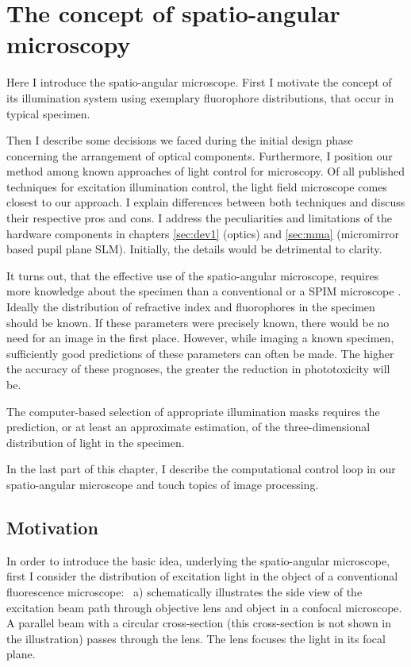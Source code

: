 \chapter{The concept of spatio-angular microscopy}
\label{sec:concept}
\begin{summary}
  Here I introduce the spatio-angular microscope. First I motivate
  the concept of its illumination system using exemplary fluorophore
  distributions, that occur in typical specimen.

  Then I describe some decisions we faced during the initial design
  phase concerning the arrangement of optical components. Furthermore,
  I position our method among known approaches of light control for
  microscopy. Of all published techniques for excitation illumination
  control, the light field microscope \citep{levoy2006} comes closest
  to our approach.  I explain differences between both techniques and
  discuss their respective pros and cons.  I address the peculiarities
  and limitations of the hardware components in chapters
  \ref{sec:dev1} (optics) and \ref{sec:mma} (micromirror based pupil
  plane SLM).  Initially, the details would be detrimental to clarity.

  It turns out, that the effective use of the spatio-angular
  microscope, requires more knowledge about the specimen than a
  conventional or a SPIM microscope \citep{Huisken2004}. Ideally
  the distribution of refractive index and fluorophores in the
  specimen should be known. If these parameters were precisely known,
  there would be no need for an image in the first place. However,
  while imaging a known specimen, sufficiently good predictions of
  these parameters can often be made. The higher the accuracy of these
  prognoses, the greater the reduction in phototoxicity will be.

  The computer-based selection of appropriate illumination masks
  requires the prediction, or at least an approximate estimation, of
  the three-dimensional distribution of light in the specimen.

  In the last part of this chapter, I describe the computational
  control loop in our spatio-angular
  microscope and touch topics of image processing.
\end{summary}
\section{Motivation}
In order to introduce the basic idea, underlying the spatio-angular
microscope, first I consider the distribution of excitation light in
the object of a conventional fluorescence microscope:
~a) schematically illustrates the side view
of the excitation beam path through objective lens and object in a
confocal microscope. A parallel beam with a circular cross-section
(this cross-section is not shown in the illustration) passes through
the lens. The lens focuses the light in its focal plane.

